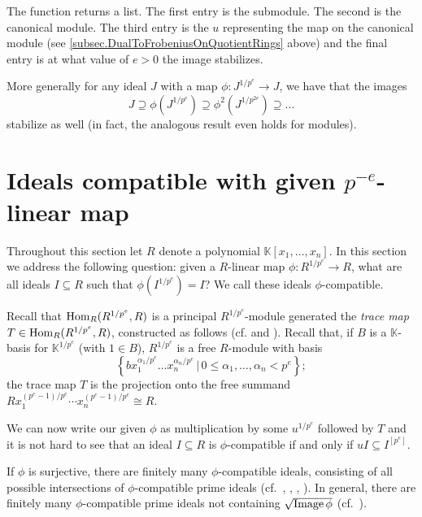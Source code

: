\documentclass{amsart}
\renewcommand{\leq}{\leqslant}
\begin{document}
The function returns a list.  The first entry is the submodule.  The second is the canonical module.  The third entry is the $u$ representing the map on the canonical module (see \autoref{subsec.DualToFrobeniusOnQuotientRings} above)
and the final entry is at what value of $e > 0$ the image stabilizes.



More generally for any ideal $J$ with a map $\phi : J^{1/p^e} \to J$, we have that the images
\[
J \supseteq \phi(J^{1/p^e}) \supseteq \phi^2(J^{1/p^{2e}}) \supseteq \dots
\]
stabilize as well (in fact, the analogous result even holds for modules).


\section{Ideals compatible with given $p^{-e}$-linear map}\label{Section: compatible ideals}

Throughout this section let $R$ denote a polynomial $\mathbb{K}[x_1, \dots, x_n]$. In this section we address the following question:
given a $R$-linear map $\phi: R^{1/p^e} \rightarrow R$, what are all ideals $I\subseteq R$ such that $\phi(I^{1/p^e})=I$?
We call these ideals $\phi$-compatible.

Recall that  $\operatorname{Hom}_R( R^{1/p^e}, R)$  is a principal $R^{1/p^e}$-module generated
the \emph{trace map} $T\in \operatorname{Hom}_R(R^{1/p^e}, R)$, constructed as follows (cf. \cite[Lemma 1.6]{FedderFPureRat} and \cite[Example 1.3.1]{BrionKumarFrobeniusSplitting}).
Recall that, if $B$ is a $\mathbb{K}$-basis for $\mathbb{K}^{1/p^e}$ (with $1\in B$),
$R^{1/p^e}$ is a free $R$-module with basis
$$\left\{ b x_1^{\alpha_1/p^e} \dots x_n^{\alpha_n/p^e} \,|\, 0\leq \alpha_1, \dots, \alpha_n < p^e \right\} ;$$
the trace map $T$ is the projection onto the free summand
$R x_1^{(p^e-1)/p^e} \cdots x_n^{(p^e-1)/p^e}\cong R$.

We can now write our given $\phi$ as multiplication by some $u^{1/p^e}$ followed by $T$ and it is not hard to see that
an ideal $I\subseteq R$ is $\phi$-compatible if and only if $u I \subseteq I^{[p^e]}$.

\begin{theorem}\label{Theorem: finitely many compatible primes}
If $\phi$ is surjective, there are finitely many $\phi$-compatible ideals, consisting of all possible intersections
of $\phi$-compatible prime ideals \textup(cf.\ \cite{KumarMehtaFiniteness}, \cite{SchwedeFAdjunction},
\cite{SharpGradedAnnihilatorsOfModulesOverTheFrobeniusSkewPolynomialRing}, \cite{EnescuHochsterTheFrobeniusStructureOfLocalCohomology}\textup).
In general, there are finitely many $\phi$-compatible prime ideals not containing $\sqrt{\operatorname{Image} \phi}$ \textup(cf.\ \cite{KatzmanSchwedeAlgorithm}\textup).

\end{theorem}
\end{document}
